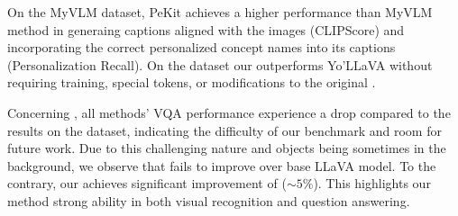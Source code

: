 On the MyVLM dataset, PeKit achieves a higher performance than MyVLM method in generaing captions aligned with the images (CLIPScore) and incorporating the correct personalized concept names into its captions (Personalization Recall). On the \yollava dataset  our \ours outperforms Yo’LLaVA without requiring training, special tokens, or modifications to the original \VLM. %

Concerning \thisismy, all methods' VQA performance experience a drop compared to the results on the \yollava dataset, indicating the difficulty of our benchmark and room for future work. Due to this  challenging nature and objects being sometimes in the background, we observe that \yollava fails to improve over base LLaVA model. To the contrary, our \ours achieves significant improvement of ($\sim 5\%$). This highlights our method strong ability in both visual recognition and question answering. 




